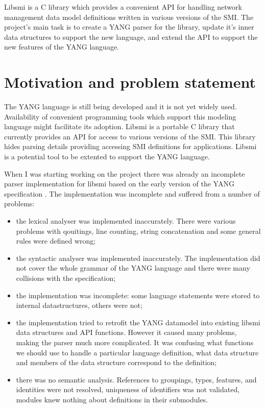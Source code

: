 \documentclass[conference]{IEEEtran}
\begin{document}
Libsmi is a C library which provides a convenient API for handling network management data model definitions written in various versions of the SMI. The project's main task is to create a YANG parser for the library, update it's inner data structures to support the new language, and extend the API to support the new features of the YANG language.

\section{Motivation and problem statement}
The YANG language is still being developed and it is not yet widely used. Availability of convenient programming tools which support this modeling language might facilitate its adoption. Libsmi is  a portable C library that currently provides an API for access to various versions of the SMI. This library hides parsing details providing accessing SMI definitions for applications. Libsmi is a potential tool to be extented to support the YANG language. 

When I was starting working on the project there was already an incomplete parser implementation for libsmi based on the early version of the YANG specification  \cite{bib2}. The implementation was incomplete and suffered from a number of problems: 
\begin{itemize}
	\item the lexical analyser was implemented inaccurately. There were various problems with qouitings, line counting, string concatenation and some general rules were defined wrong;
	\item the syntactic analyser was implemented inaccurately. The implementation did not cover the whole grammar of the YANG language and there were many collisions with the specification;
	\item the implementation was incomplete: some language statements were stored to internal datastructures, others were not;
	\item the implementation tried to retrofit the YANG datamodel into existing libsmi data structures and API functions. However it caused many problems, making the parser much more complicated. It was confusing what functions we should use to handle a particular language definition, what data structure and members of the data structure correspond to the definition;
	\item there was no semantic analysis. References to groupings, types, features, and identities were not resolved, uniqueness of identifiers was not validated, modules knew nothing about definitions in their submodules.
\end{itemize}
\end{document}
